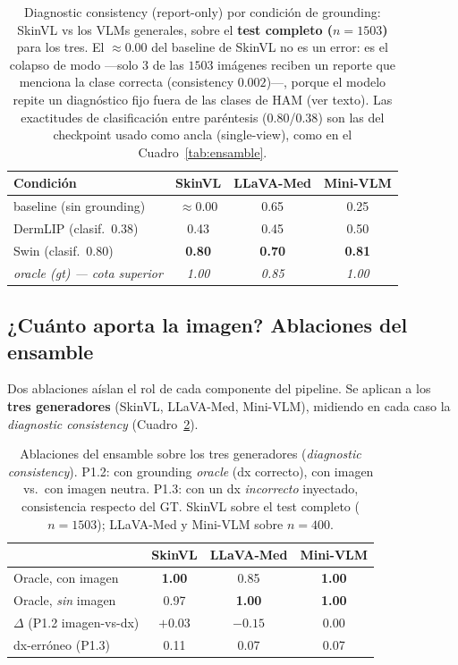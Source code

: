 \documentclass[11pt, a4paper]{article}
\begin{document}
\begin{table}[H]
  \centering
  \caption{Diagnostic consistency (report-only) por condición de grounding: SkinVL vs los VLMs generales,
  sobre el \textbf{test completo ($n=1503$)} para los tres. El $\approx$0.00
  del baseline de SkinVL no es un error: es el colapso de modo —solo $3$ de las $1503$ imágenes reciben un
  reporte que menciona la clase correcta (consistency $0.002$)—, porque el modelo repite un diagnóstico
  fijo fuera de las clases de HAM (ver texto). Las exactitudes de clasificación entre paréntesis
  ($0.80$/$0.38$) son las del checkpoint usado como ancla (single-view), como en el Cuadro~\ref{tab:ensamble}.}
  \label{tab:skinvl}
  \begin{tabular}{lccc}
    \toprule
    \textbf{Condición} & \textbf{SkinVL} & \textbf{LLaVA-Med} & \textbf{Mini-VLM} \\
    \midrule
    baseline (sin grounding) & $\approx$0.00 & 0.65 & 0.25 \\
    DermLIP (clasif.\ 0.38)  & 0.43 & 0.45 & 0.50 \\
    Swin (clasif.\ 0.80)     & \textbf{0.80} & \textbf{0.70} & \textbf{0.81} \\
    \midrule
    \textit{oracle (gt) --- cota superior} & \textit{1.00} & \textit{0.85} & \textit{1.00} \\
    \bottomrule
  \end{tabular}
\end{table}

\subsection{¿Cuánto aporta la imagen? Ablaciones del ensamble}
\label{sec:ablaciones}
Dos ablaciones aíslan el rol de cada componente del pipeline. Se aplican a los \textbf{tres generadores}
(SkinVL, LLaVA-Med, Mini-VLM), midiendo en cada caso la \emph{diagnostic consistency}
(Cuadro~\ref{tab:ablaciones}).

\begin{table}[H]
  \centering
  \caption{Ablaciones del ensamble sobre los tres generadores (\emph{diagnostic consistency}). P1.2:
  con grounding \emph{oracle} (dx correcto), con imagen vs.\ con imagen neutra. P1.3: con un dx
  \emph{incorrecto} inyectado, consistencia respecto del GT. SkinVL sobre el test completo ($n{=}1503$);
  LLaVA-Med y Mini-VLM sobre $n{=}400$.}
  \label{tab:ablaciones}
  \begin{tabular}{lccc}
    \toprule
    & \textbf{SkinVL} & \textbf{LLaVA-Med} & \textbf{Mini-VLM} \\
    \midrule
    Oracle, con imagen        & \textbf{1.00} & 0.85 & \textbf{1.00} \\
    Oracle, \emph{sin} imagen & 0.97 & \textbf{1.00} & \textbf{1.00} \\
    \quad$\Delta$ (P1.2 imagen-vs-dx) & $+0.03$ & $-0.15$ & $0.00$ \\
    \addlinespace
    dx-erróneo (P1.3)         & 0.11 & 0.07 & 0.07 \\
    \bottomrule
  \end{tabular}
\end{table}
\end{document}
